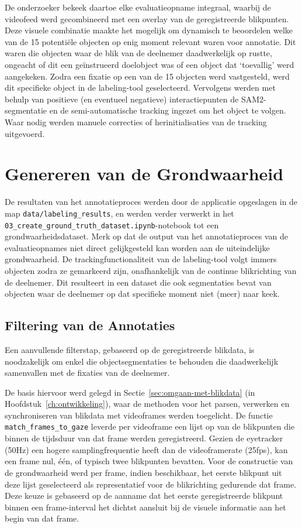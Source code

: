 De onderzoeker bekeek daartoe elke evaluatieopname integraal, waarbij de videofeed werd gecombineerd met een overlay 
van de geregistreerde blikpunten. Deze visuele combinatie maakte het mogelijk om dynamisch te beoordelen welke van de 15 potentiële 
objecten op enig moment relevant waren voor annotatie. Dit waren die objecten waar de blik van de deelnemer daadwerkelijk op rustte, 
ongeacht of dit een geïnstrueerd doelobject was of een object dat `toevallig' werd aangekeken. 
Zodra een fixatie op een van de 15 objecten werd vastgesteld, werd dit specifieke object in de labeling-tool geselecteerd. 
Vervolgens werden met behulp van positieve (en eventueel negatieve) interactiepunten de SAM2-segmentatie en de semi-automatische 
tracking ingezet om het object te volgen. Waar nodig werden manuele correcties of herinitialisaties van de tracking uitgevoerd.

\section{Genereren van de Grondwaarheid}

De resultaten van het annotatieproces werden door de applicatie opgeslagen in de map \texttt{data/labeling\_results}, en werden 
verder verwerkt in het \texttt{03\_create\_grou\-nd\_truth\_dataset.ipynb}-notebook tot een grondwaarheidsdataset.
Merk op dat de output van het annotatieproces van de evaluatieopnames niet direct gelijkgesteld kan worden aan de uiteindelijke grondwaarheid. 
De trackingfunctionaliteit van de labeling-tool volgt immers objecten zodra ze gemarkeerd zijn, onafhankelijk van de continue blikrichting van de deelnemer. 
Dit resulteert in een dataset die ook segmentaties bevat van objecten waar de deelnemer op dat specifieke moment niet (meer) naar keek.

\subsection{Filtering van de Annotaties}
\label{sec:filtering-annotaties}

Een aanvullende filterstap, gebaseerd op de geregistreerde blikdata, is noodzakelijk om enkel die objectsegmentaties 
te behouden die daadwerkelijk samenvallen met de fixaties van de deelnemer.

De basis hiervoor werd gelegd in Sectie~\ref{sec:omgaan-met-blikdata} (in Hoofdstuk~\ref{ch:ontwikkeling}), 
waar de methoden voor het parsen, verwerken en synchroniseren van blikdata met videoframes werden toegelicht. 
De functie \texttt{match\_frames\_to\_gaze} leverde per videoframe een lijst op van de blikpunten die binnen de tijdsduur 
van dat frame werden geregistreerd. 
Gezien de eyetracker (50Hz) een hogere samplingfrequentie heeft dan de videoframerate (25fps), 
kan een frame nul, één, of typisch twee blikpunten bevatten. 
Voor de constructie van de grondwaarheid werd per frame, indien beschikbaar, het eerste blikpunt uit deze lijst geselecteerd 
als representatief voor de blikrichting gedurende dat frame. 
Deze keuze is gebaseerd op de aanname dat het eerste geregistreerde blikpunt binnen een frame-interval 
het dichtst aansluit bij de visuele informatie aan het begin van dat frame.

